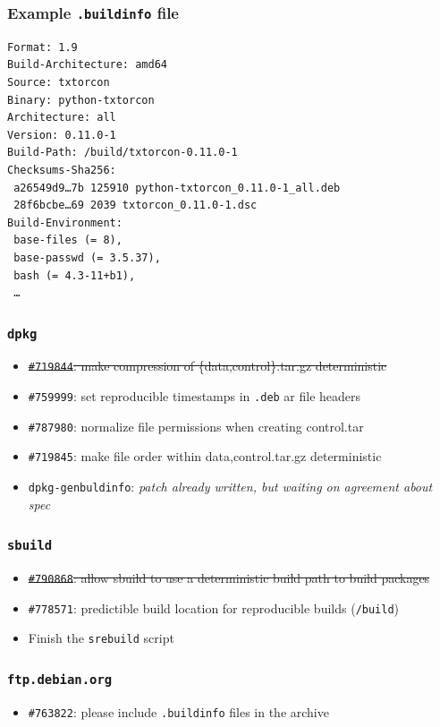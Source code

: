 \documentclass[14pt]{beamer}
\begin{document}
\begin{frame}[fragile]
 \frametitle{Example \texttt{.buildinfo} file}

{\small
\begin{verbatim}
Format: 1.9
Build-Architecture: amd64
Source: txtorcon
Binary: python-txtorcon
Architecture: all
Version: 0.11.0-1
Build-Path: /build/txtorcon-0.11.0-1
Checksums-Sha256:
 a26549d9…7b 125910 python-txtorcon_0.11.0-1_all.deb
 28f6bcbe…69 2039 txtorcon_0.11.0-1.dsc
Build-Environment:
 base-files (= 8),
 base-passwd (= 3.5.37),
 bash (= 4.3-11+b1),
 …
\end{verbatim}
}
\end{frame}




\begin{frame}
 \frametitle{\texttt{dpkg}}

 \begin{itemize}
  \item \sout{\texttt{\#719844}: make compression of \{data,control\}.tar.gz deterministic}
  \item \texttt{\#759999}: set reproducible timestamps in \texttt{.deb} ar file headers
  \item \texttt{\#787980}: normalize file permissions when creating control.tar
  \item \texttt{\#719845}: make file order within {data,control}.tar.gz deterministic
  \item \texttt{dpkg-genbuldinfo}: \textit{patch already written, but waiting on agreement about spec}
 \end{itemize}
\end{frame}

\begin{frame}
 \frametitle{\texttt{sbuild}}

 \begin{itemize}
  \item \sout{\texttt{\#790868}: allow sbuild to use a deterministic build
  path to build packages}
  \item \texttt{\#778571}: predictible build location for reproducible builds
  (\texttt{/build})
  \item Finish the \texttt{srebuild} script
 \end{itemize}
\end{frame}

\begin{frame}
 \frametitle{\texttt{ftp.debian.org}}

 \begin{itemize}
  \item \texttt{\#763822}: please include \texttt{.buildinfo} files in the archive
 \end{itemize}
\end{frame}
\end{document}
